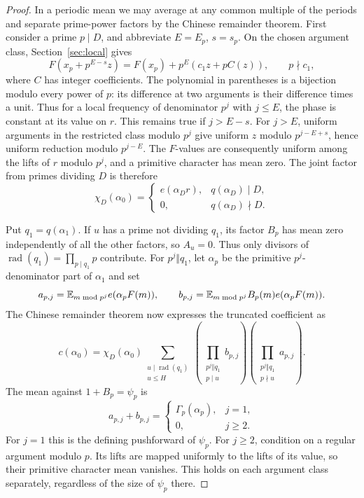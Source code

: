 \begin{proof}
In a periodic mean we may average at any common multiple of the
periods and separate prime-power factors by the Chinese remainder
theorem. First consider a prime $p\mid D$, and abbreviate
$E=E_p$, $s=s_p$. On the chosen argument class, Section~\ref{sec:local}
gives
\[
 F(x_p+p^{E-s}z)=F(x_p)+p^E(c_1z+pC(z)),\qquad p\nmid c_1,
\]
where $C$ has integer coefficients. The polynomial in parentheses
is a bijection modulo every power of $p$: its difference at two
arguments is their difference times a unit. Thus for a local frequency
of denominator $p^j$ with $j\le E$, the phase is constant at its
value on $r$. This remains true if $j>E-s$. For $j>E$, uniform
arguments in the restricted class modulo $p^j$ give uniform $z$
modulo $p^{j-E+s}$, hence uniform reduction modulo $p^{j-E}$.
The $F$-values are consequently uniform among the lifts of $r$
modulo $p^j$, and a primitive character has mean zero.
The joint factor from primes dividing $D$ is therefore
\[
 \chi_D(\alpha_0)=
 \begin{cases}
 e(\alpha_Dr),&q(\alpha_D)\mid D,\\
 0,&q(\alpha_D)\nmid D.
 \end{cases}
\]

Put $q_1=q(\alpha_1)$. If $u$ has a prime not dividing $q_1$,
its factor $B_p$ has mean zero independently of all the other
factors, so $A_u=0$. Thus only divisors of
$\operatorname{rad}(q_1)=\prod_{p\mid q_1}p$ contribute.
For $p^j\Vert q_1$, let $\alpha_p$ be the primitive $p^j$-denominator
part of $\alpha_1$ and set
\[
 a_{p,j}=\mathbb E_{m\bmod p^j}e(\alpha_pF(m)),\qquad
 b_{p,j}=\mathbb E_{m\bmod p^j}B_p(m)e(\alpha_pF(m)).
\]
The Chinese remainder theorem now expresses the truncated coefficient as
\begin{equation}
 c(\alpha_0)=\chi_D(\alpha_0)
 \sum_{\substack{u\mid\operatorname{rad}(q_1)\\u\le H}}
 \left(\prod_{\substack{p^j\Vert q_1\\p\mid u}}b_{p,j}\right)
 \left(\prod_{\substack{p^j\Vert q_1\\p\nmid u}}a_{p,j}\right).
 \label{kernel:truncated-coefficient}
\end{equation}
The mean against $1+B_p=\psi_p$ is
\[
 a_{p,j}+b_{p,j}=
 \begin{cases}
 \Gamma_p(\alpha_p),&j=1,\\
 0,&j\ge2.
 \end{cases}
\]
For $j=1$ this is the defining pushforward of $\psi_p$. For
$j\ge2$, condition on a regular argument modulo $p$. Its lifts
are mapped uniformly to the lifts of its value, so their primitive
character mean vanishes. This holds on each argument class separately,
regardless of the size of $\psi_p$ there.


\end{proof}
